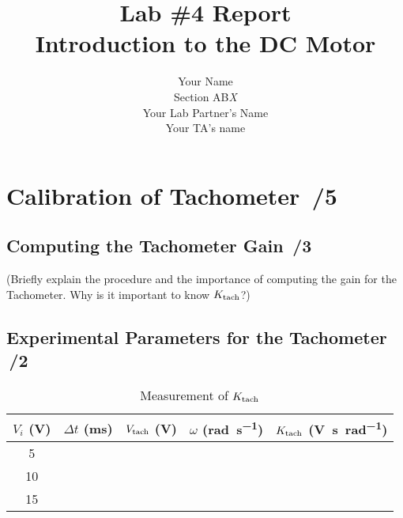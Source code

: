 \documentclass{article}
\newcommand{\score}{\hfill \underline{\hspace{0.65cm}}\,/} %
\begin{document}
%
\title{\bf Lab \#4 Report\\{\sc Introduction to the DC Motor}}
\author{Your Name\\ Section AB\emph{X}\\
Your Lab Partner's Name\\
Your TA's name}
\maketitle

\noindent {}

\section{Calibration of Tachometer \score 5}
\subsection{Computing the Tachometer Gain \score 3}
(Briefly explain the procedure and the importance of computing the gain for the Tachometer. Why is it important to know $K_{\rm tach}$?)

\subsection{Experimental Parameters for the Tachometer \score 2}
\begin{table}[phtb] 
\begin{center}
\caption{Measurement of $K_{\rm tach}$}
\label{tbl:lab4_q1}
\begin{tabular}{c|r|r|r|r} \hline \hline 
\cellcolor{lightgray} $V_i$ (\si{\volt}) & \cellcolor{lightgray} $\Delta t$ (\si{\milli\second}) & \cellcolor{lightgray} $V_{\rm tach}$ (\si{V}) & \cellcolor{lightgray} $\omega$ (\si{\radian\per\second}) & \cellcolor{lightgray} $K_{\rm tach}$ (\si{\volt\second\per\radian}) \\
\hline
5  &  &  &  &  \\ \hline
10 &  &  &  &  \\ \hline
15 &  &  &  &  \\ \hline
\end{tabular}
\end{center}
\end{table}
\end{document}

